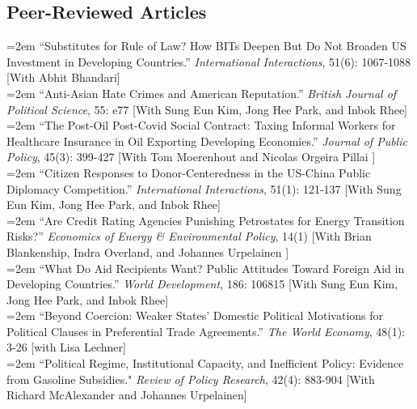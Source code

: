 \subsection*{Peer-Reviewed Articles}


\hangindent=2em 
 ``Substitutes for Rule of Law? How BITs Deepen But Do Not Broaden US Investment in Developing Countries.'' \textit{International Interactions}, 51(6): 1067-1088  [With Abhit Bhandari]\\


\hangindent=2em 
 ``Anti-Asian Hate Crimes and American Reputation.'' \textit{British Journal of Political Science}, 55: e77  [With Sung Eun Kim, Jong Hee Park, and Inbok Rhee]\\


\hangindent=2em 
 ``The Post-Oil Post-Covid Social Contract: Taxing Informal Workers for Healthcare Insurance in Oil Exporting Developing Economies.'' \textit{Journal of Public Policy}, 45(3): 399-427  [With Tom Moerenhout and Nicolas Orgeira Pillai ]\\


\hangindent=2em 
 ``Citizen Responses to Donor-Centeredness in the US-China Public Diplomacy Competition.'' \textit{International Interactions}, 51(1): 121-137  [With Sung Eun Kim, Jong Hee Park, and Inbok Rhee]\\

\hangindent=2em
  ``Are Credit Rating Agencies Punishing Petrostates for Energy Transition Risks?'' \textit{Economics of Energy \& Environmental Policy}, 14(1)  [With Brian Blankenship, Indra Overland, and Johannes Urpelainen ]\\


\hangindent=2em 
 ``What Do Aid Recipients Want? Public Attitudes Toward Foreign Aid in Developing Countries.'' \textit{World Development}, 186: 106815  [With Sung Eun Kim, Jong Hee Park, and Inbok Rhee]\\

\hangindent=2em
 ``Beyond Coercion: Weaker States' Domestic Political Motivations for Political Clauses in Preferential Trade Agreements.'' \textit{The World Economy}, 48(1): 3-26  [with Lisa Lechner] \\

\hangindent=2em 
 ``Political Regime, Institutional Capacity, and Inefficient Policy: Evidence from Gasoline Subsidies." \textit{Review of Policy Research}, 42(4): 883-904 [With Richard McAlexander and Johannes Urpelainen] \\

